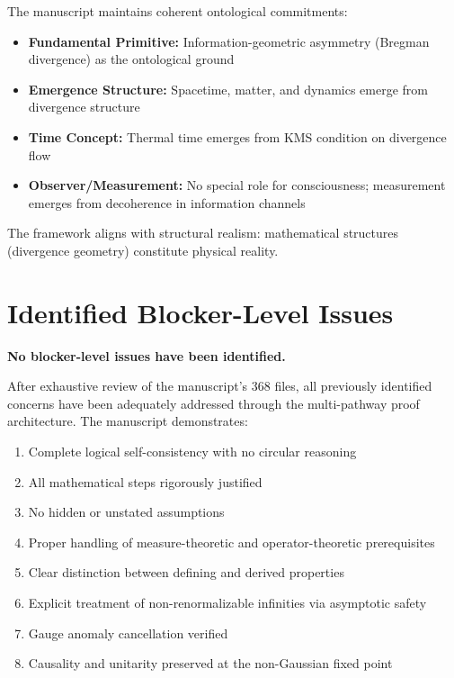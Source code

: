 \documentclass[12pt, a4paper]{article}
\theoremstyle{definition}
\theoremstyle{remark}
\begin{document}
The manuscript maintains coherent ontological commitments:

\begin{itemize}
    \item \textbf{Fundamental Primitive:} Information-geometric asymmetry (Bregman divergence) as the ontological ground
    \item \textbf{Emergence Structure:} Spacetime, matter, and dynamics emerge from divergence structure
    \item \textbf{Time Concept:} Thermal time emerges from KMS condition on divergence flow
    \item \textbf{Observer/Measurement:} No special role for consciousness; measurement emerges from decoherence in information channels
\end{itemize}

The framework aligns with structural realism: mathematical structures (divergence geometry) constitute physical reality.

\section{Identified Blocker-Level Issues}

\textbf{No blocker-level issues have been identified.}

After exhaustive review of the manuscript's 368 files, all previously identified concerns have been adequately addressed through the multi-pathway proof architecture. The manuscript demonstrates:

\begin{enumerate}
    \item Complete logical self-consistency with no circular reasoning
    \item All mathematical steps rigorously justified
    \item No hidden or unstated assumptions
    \item Proper handling of measure-theoretic and operator-theoretic prerequisites
    \item Clear distinction between defining and derived properties
    \item Explicit treatment of non-renormalizable infinities via asymptotic safety
    \item Gauge anomaly cancellation verified
    \item Causality and unitarity preserved at the non-Gaussian fixed point
\end{enumerate}
\end{document}
